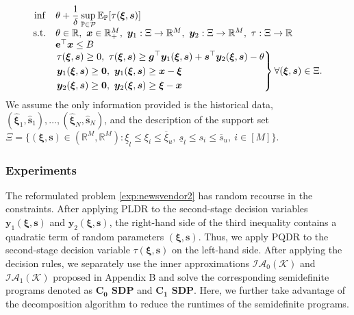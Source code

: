 \documentclass{article}
\newcommand{\st}{\textnormal{s.t.}}
\newcommand{\PP}{\mathbb{P}}
\newcommand{\EE}{\mathbb{E}}
\newcommand{\RR}{\mathbb{R}}
\begin{document}
\begin{equation}
\label{exp:newsvendor2}
\begin{array}{clll}
   \displaystyle \text{inf} & \displaystyle \theta + \frac{1}{\delta} \sup_{\PP\in\mathcal P}\EE_\PP [\tau(\bm \xi,\bm s)]  \\
   \st &\theta\in \mathbb{R}, \ \bm x \in \mathbb{R}^M_{+}, \ \bm y_1: \Xi \rightarrow \RR^{M}, \ \bm y_2: \Xi \rightarrow \RR^{M}, \ \tau: \Xi \rightarrow \RR\\
   & \mathbf{e}^\top \bm x \leq B \\
   & \left.\begin{aligned}
   & \tau(\bm \xi, \bm s) \geq 0, \ \tau(\bm \xi, \bm s) \geq \bm g^\top\bm y_1(\bm \xi,\bm s) +\bm s^\top \bm y_2(\bm \xi,\bm s) -  \theta \\
   & \bm y_1(\bm \xi,\bm s) \geq \bm 0, \ \bm y_1(\bm \xi,\bm s) \geq \bm x - \bm \xi \\
   & \bm y_2(\bm \xi,\bm s) \geq \bm 0,\ \bm y_2(\bm \xi,\bm s) \geq \bm \xi- \bm x
\end{aligned}\right\}  \forall(\bm \xi, \bm s) \in \Xi.
\end{array}
\end{equation}
We assume the only information provided is the historical data, $(\hat{\bm \xi}_1, \hat{\bm s}_1),\ldots,(\hat{\bm \xi}_N, \hat{\bm s}_N)$, and the description of the support set  $ \Xi= \{ (\bm \xi, \bm s) \in (\RR^{M},\RR^{M}) :\underline{\xi}_l \leq \xi_i \leq \overline{\xi}_u, \ \underline{s}_l \leq s_{i} \leq \overline{s}_u,\ i \in [M]\}$. 

\subsubsection{Experiments}
The reformulated problem \eqref{exp:newsvendor2} has random recourse in the constraints. After applying PLDR to the second-stage decision variables $\bm y_1(\bm \xi,\bm s)$ and $\bm y_2(\bm \xi,\bm s)$, the right-hand side of the third inequality contains a quadratic term of random parameters $(\bm \xi, \bm s)$. Thus, we apply PQDR to the second-stage decision variable $\tau(\bm \xi, \bm s)$ on the left-hand side. After applying the decision rules, we separately use the inner approximations $\mathcal{IA}_0\mathcal{(K)}$ and $\mathcal{IA}_1\mathcal{(K)}$ proposed in Appendix B and solve the corresponding semidefinite programs denoted as \textbf{$\mathbf{C_0}$ SDP} and \textbf{$\mathbf{C_1}$ SDP}. Here, we further take advantage of the decomposition algorithm to reduce the runtimes of the semidefinite programs. 
\end{document}
